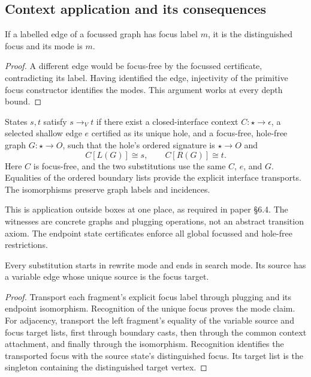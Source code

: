 \subsection{Context application and its consequences}
\begin{lemma}
If a labelled edge of a focussed graph has focus label $m$, it is the
distinguished focus and its mode is $m$.
\end{lemma}
\begin{proof}
A different edge would be focus-free by the focussed certificate, contradicting
its label. Having identified the edge, injectivity of the primitive focus
constructor identifies the modes. This argument works at every depth bound.
\end{proof}
\begin{definition}
States $s,t$ satisfy $s\to_V t$ if there exist a closed-interface context
$C:\star\to\epsilon$, a selected shallow edge $e$ certified as its unique
hole, and a focus-free, hole-free graph $G:\star\to O$, such that the hole's
ordered signature is $\star\to O$ and
\[
 C[L(G)]\cong s,\qquad C[R(G)]\cong t.
\]
Here $C$ is focus-free, and the two substitutions use the same $C$, $e$, and
$G$. Equalities of the ordered boundary lists provide the explicit interface
transports. The isomorphisms preserve graph labels and incidences.
\end{definition}
This is application outside boxes at one place, as required in paper \S6.4.
The witnesses are concrete graphs and plugging operations, not an abstract
transition axiom. The endpoint state certificates enforce all global focussed
and hole-free restrictions.
\begin{lemma}
Every substitution starts in rewrite mode and ends in search mode. Its source
has a variable edge whose unique source is the focus target.
\end{lemma}
\begin{proof}
Transport each fragment's explicit focus label through plugging and its
endpoint isomorphism. Recognition of the unique focus proves the mode claim.
For adjacency, transport the left fragment's equality of the variable source
and focus target lists, first through boundary casts, then through the common
context attachment, and finally through the isomorphism. Recognition identifies
the transported focus with the source state's distinguished focus. Its target
list is the singleton containing the distinguished target vertex.
\end{proof}
